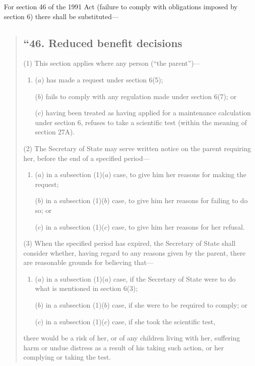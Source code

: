\documentclass[12pt,a4paper]{article}
\begin{document}
For section 46 of the 1991 Act (failure to comply with obligations imposed by section 6) there shall be substituted—
\begin{quotation}
\subsection*{“46. Reduced benefit decisions}

(1) This section applies where any person (“the parent”)—
\begin{enumerate}\item[]
($a$) has made a request under section 6(5);

($b$) fails to comply with any regulation made under section 6(7); or

($c$) having been treated as having applied for a maintenance calculation under section 6, refuses to take a scientific test (within the meaning of section 27A).
\end{enumerate}

(2) The Secretary of State may serve written notice on the parent requiring her, before the end of a specified period—
\begin{enumerate}\item[]
($a$) in a subsection (1)($a$)  case, to give him her reasons for making the request;

($b$) in a subsection (1)($b$)  case, to give him her reasons for failing to do so; or

($c$) in a subsection (1)($c$)  case, to give him her reasons for her refusal.
\end{enumerate}

(3) When the specified period has expired, the Secretary of State shall consider whether, having regard to any reasons given by the parent, there are reasonable grounds for believing that—
\begin{enumerate}\item[]
($a$) in a subsection (1)($a$)  case, if the Secretary of State were to do what is mentioned in section 6(3);

($b$) in a subsection (1)($b$)  case, if she were to be required to comply; or

($c$) in a subsection (1)($c$)  case, if she took the scientific test,
\end{enumerate}
there would be a risk of her, or of any children living with her, suffering harm or undue distress as a result of his taking such action, or her complying or taking the test.


\end{quotation}
\end{document}
